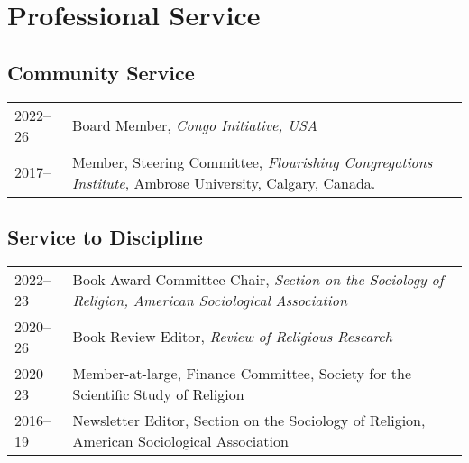 \section*{Professional Service}
\newcommand{\tabitem}{~~\llap{\textbullet}~~}
\subsection*{Community Service}
\begin{tabular}{p{} p{}}
2022--26 & Board Member, \textit{Congo Initiative, USA}\\
2017-- & Member, Steering Committee, \textit{Flourishing Congregations Institute}, Ambrose University, Calgary, Canada.\\
\end{tabular}

\subsection*{Service to Discipline}

\begin{tabular}{p{} p{}}
2022--23 & Book Award Committee Chair, \textit{Section on the Sociology of Religion, American Sociological Association}\\
2020--26 & Book Review Editor, \textit{Review of Religious Research}\\
2020--23 & Member-at-large, Finance Committee, Society for the Scientific Study of Religion\\
2016--19 & Newsletter Editor, Section on the Sociology of Religion, American Sociological Association\\
\end{tabular}


